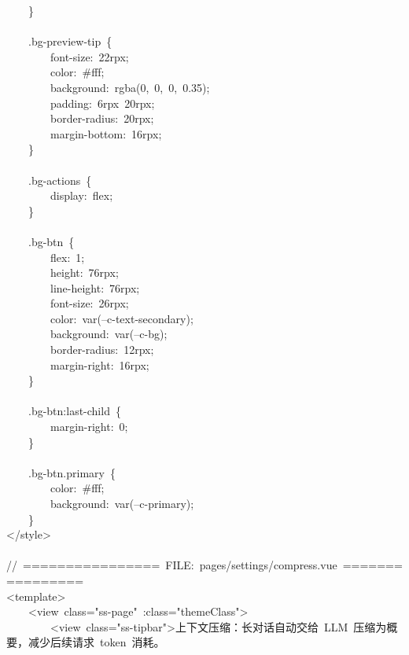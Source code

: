 \documentclass[a4paper,10pt]{article}
\begin{document}
{\ttfamily\footnotesize\raggedright
~~~~\}\\
\mbox{}\\
~~~~.bg-preview-tip~\{\\
~~~~~~~~font-size:~22rpx;\\
~~~~~~~~color:~\#fff;\\
~~~~~~~~background:~rgba(0,~0,~0,~0.35);\\
~~~~~~~~padding:~6rpx~20rpx;\\
~~~~~~~~border-radius:~20rpx;\\
~~~~~~~~margin-bottom:~16rpx;\\
~~~~\}\\
\mbox{}\\
~~~~.bg-actions~\{\\
~~~~~~~~display:~flex;\\
~~~~\}\\
\mbox{}\\
~~~~.bg-btn~\{\\
~~~~~~~~flex:~1;\\
~~~~~~~~height:~76rpx;\\
~~~~~~~~line-height:~76rpx;\\
~~~~~~~~font-size:~26rpx;\\
~~~~~~~~color:~var(--c-text-secondary);\\
~~~~~~~~background:~var(--c-bg);\\
~~~~~~~~border-radius:~12rpx;\\
~~~~~~~~margin-right:~16rpx;\\
~~~~\}\\
\mbox{}\\
~~~~.bg-btn:last-child~\{\\
~~~~~~~~margin-right:~0;\\
~~~~\}\\
\mbox{}\\
~~~~.bg-btn.primary~\{\\
~~~~~~~~color:~\#fff;\\
~~~~~~~~background:~var(--c-primary);\\
~~~~\}\\
</style>\\
\mbox{}\\
//~================~FILE:~pages/settings/compress.vue~================\\
<template>\\
~~~~<view~class="ss-page"~:class="themeClass">\\
~~~~~~~~<view~class="ss-tipbar">上下文压缩：长对话自动交给~LLM~压缩为概要，减少后续请求~token~消耗。\\
}
\end{document}
